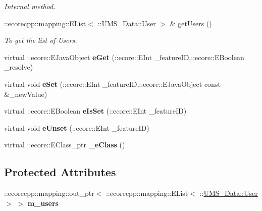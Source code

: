 \begin{DoxyCompactItemize}
\begin{DoxyCompactList}\small\item\em Internal method. \item\end{DoxyCompactList}\item 
::ecorecpp::mapping::EList$<$ ::\hyperlink{classUMS__Data_1_1User}{UMS\_\-Data::User} $>$ \& \hyperlink{classUMS__Data_1_1ListUsers_a60458433bb8a1119ccbf230d3abb4a1e}{getUsers} ()
\begin{DoxyCompactList}\small\item\em To get the list of Users. \item\end{DoxyCompactList}\item 
\hypertarget{classUMS__Data_1_1ListUsers_ace7170da892359f18c348b2cbdc9572c}{
virtual ::ecore::EJavaObject {\bfseries eGet} (::ecore::EInt \_\-featureID,::ecore::EBoolean \_\-resolve)}
\label{classUMS__Data_1_1ListUsers_ace7170da892359f18c348b2cbdc9572c}

\item 
\hypertarget{classUMS__Data_1_1ListUsers_a05dc443a836801bd6ba83f66b769eaf4}{
virtual void {\bfseries eSet} (::ecore::EInt \_\-featureID,::ecore::EJavaObject const \&\_\-newValue)}
\label{classUMS__Data_1_1ListUsers_a05dc443a836801bd6ba83f66b769eaf4}

\item 
\hypertarget{classUMS__Data_1_1ListUsers_aba25e94c888174e1bf3cefba9abfb1fc}{
virtual ::ecore::EBoolean {\bfseries eIsSet} (::ecore::EInt \_\-featureID)}
\label{classUMS__Data_1_1ListUsers_aba25e94c888174e1bf3cefba9abfb1fc}

\item 
\hypertarget{classUMS__Data_1_1ListUsers_a9351583aae21c5bec45c066cd36df165}{
virtual void {\bfseries eUnset} (::ecore::EInt \_\-featureID)}
\label{classUMS__Data_1_1ListUsers_a9351583aae21c5bec45c066cd36df165}

\item 
\hypertarget{classUMS__Data_1_1ListUsers_a4882e84cadf19a30d666205204bd11f6}{
virtual ::ecore::EClass\_\-ptr {\bfseries \_\-eClass} ()}
\label{classUMS__Data_1_1ListUsers_a4882e84cadf19a30d666205204bd11f6}

\end{DoxyCompactItemize}
\subsection*{Protected Attributes}
\begin{DoxyCompactItemize}
\item 
\hypertarget{classUMS__Data_1_1ListUsers_acd8c092bf6fe4eb6ab07f93a33ade341}{
::ecorecpp::mapping::out\_\-ptr$<$ ::ecorecpp::mapping::EList$<$ ::\hyperlink{classUMS__Data_1_1User}{UMS\_\-Data::User} $>$ $>$ {\bfseries m\_\-users}}
\label{classUMS__Data_1_1ListUsers_acd8c092bf6fe4eb6ab07f93a33ade341}

\end{DoxyCompactItemize}


